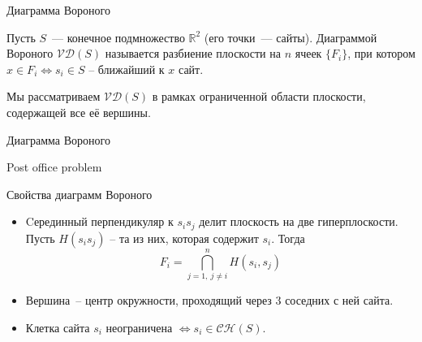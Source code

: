 \documentclass[12pt,aspectratio=169,svgnames]{beamer}
\begin{document}
\maketitle

    \begin{frame}{Диаграмма Вороного}

        \begin{defn}

            Пусть $S$~--- конечное подмножество $\mathbb{R}^2$ (его точки~--- \alert{сайты}).
            Диаграммой Вороного $\mathcal{V}\mathcal{D}(S)$ называется разбиение плоскости на $n$ ячеек $\{ F_i \}$, при котором $x \in F_i
            \Leftrightarrow s_i \in S$ -- ближайший к $x$ \alert{сайт}.

        \end{defn}

        Мы рассматриваем $\mathcal{V}\mathcal{D}(S)$ в рамках ограниченной области плоскости, содержащей все её
        вершины.

    \end{frame}

    \begin{frame}{Диаграмма Вороного}
        
        \begin{center}


        \end{center}

        
    \end{frame}

    \begin{frame}{Post office problem}
    \vspace{-17.5mm}
    \begin{center}


    \end{center}

    \end{frame}

    \begin{frame}{Свойства диаграмм Вороного}

        \begin{itemize}

            \item Cерединный перпендикуляр к $s_i s_j$ делит плоскость на две гиперплоскости. Пусть $H(s_i s_j)$ -- та из них, которая содержит $s_i$.
                  Тогда
                  \[ F_i = \bigcap\limits_{j = 1, \ j \neq i}^{n} H(s_i, s_j)\]

            \item Вершина~-- центр окружности, проходящий через 3 соседних с ней сайта.

            \item Клетка сайта $s_i$ неограничена $\Leftrightarrow s_i \in \mathcal{C}\mathcal{H}(S)$.

        \end{itemize}

    \end{frame}
\end{document}
